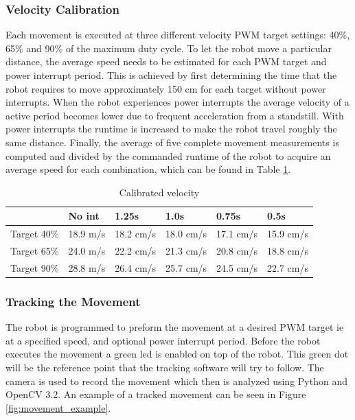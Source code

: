 \subsubsection{Velocity Calibration}

Each movement is executed at three different velocity PWM target settings: 40\%, 65\% and 90\% of the maximum duty cycle.
To let the robot move a particular distance, the average speed needs to be estimated for each PWM target and power interrupt period.
This is achieved by first determining the time that the robot requires to move approximately 150 cm for each target without power interrupts.
When the robot experiences power interrupts the average velocity of a active period becomes lower due to frequent acceleration from a standstill.
With power interrupts the runtime is increased to make the robot travel roughly the same distance.
Finally, the average of five complete movement measurements is computed and divided by the commanded runtime of the robot to acquire an average speed for each combination, which can be found in Table \ref{tab:val_calib}.


\begin{table}[t]
	\centering
	\small
	\caption{Calibrated velocity}
	\label{tab:val_calib}
	\begin{tabular}{|l|l|l|l|l|l|}
		\hline
		& No int & 1.25s & 1.0s & 0.75s & 0.5s \\
		\hline \hline
		Target 40\% & 18.9 m/s & 18.2 cm/s & 18.0 cm/s & 17.1 cm/s & 15.9 cm/s \\
		Target 65\% & 24.0 m/s & 22.2 cm/s & 21.3 cm/s & 20.8 cm/s & 18.8 cm/s \\
		Target 90\% & 28.8 m/s & 26.4 cm/s & 25.7 cm/s & 24.5 cm/s & 22.7 cm/s \\
		\hline
	\end{tabular}
\end{table}

\subsubsection{Tracking the Movement}

The robot is programmed to preform the movement at a desired PWM target ie at a specified speed, and optional power interrupt period.
Before the robot executes the movement a green led is enabled on top of the robot.
This green dot will be the reference point that the tracking software will try to follow.
The camera is used to record the movement which then is analyzed using Python and OpenCV 3.2.
An example of a tracked movement can be seen in Figure \ref{fig:movement_example}.

